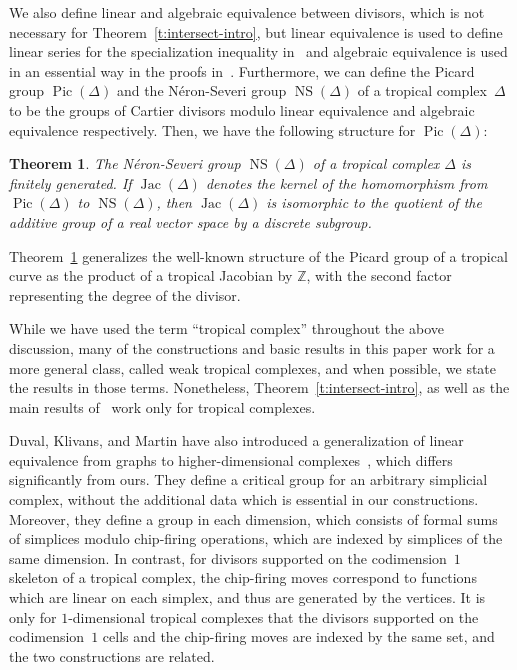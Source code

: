 \documentclass[11pt,reqno]{amsart}
\newtheorem{thm}{Theorem}[section]
\theoremstyle{definition}
\newcommand{\Jac}{\operatorname{Jac}}
\newcommand{\NS}{\operatorname{NS}}
\newcommand{\Pic}{\operatorname{Pic}}
\newcommand{\ZZ}{\mathbb Z}
\begin{document}
We also define linear and algebraic equivalence between divisors, which is not
necessary for Theorem~\ref{t:intersect-intro}, but linear equivalence is used to
define linear series for the specialization inequality
in~\cite{cartwright-specialization} and algebraic equivalence is used in an
essential way in the proofs in~\cite{cartwright-surfaces}. Furthermore, we can
define the Picard group $\Pic(\Delta)$ and the N\'eron-Severi group
$\NS(\Delta)$ of a tropical complex~$\Delta$ to be the groups of Cartier
divisors modulo linear equivalence and algebraic equivalence respectively. Then,
we have the following structure for $\Pic(\Delta)$:
\begin{thm}\label{t:picard-structure}
The N\'eron-Severi group
$\NS(\Delta)$ of a tropical complex $\Delta$ is finitely generated. If
$\Jac(\Delta)$ denotes the kernel of the homomorphism from $\Pic(\Delta)$ to
$\NS(\Delta)$, then $\Jac(\Delta)$ is isomorphic to the quotient of
the additive group of a real vector space by a discrete subgroup.
\end{thm}
\noindent Theorem~\ref{t:picard-structure} generalizes the well-known structure
of the Picard group of a tropical curve as the product of a tropical Jacobian by
$\ZZ$, with the second factor representing the degree of the divisor.

While we have used the term ``tropical complex'' throughout the above
discussion, many of the constructions and basic results in this paper work
for a more general class, called weak tropical complexes, and when
possible, we state the results in those terms. Nonetheless,
Theorem~\ref{t:intersect-intro}, as well as the main results
of~\cites{cartwright-surfaces,cartwright-specialization} work only for tropical
complexes.

Duval, Klivans, and Martin have also introduced a generalization of linear
equivalence from graphs to higher-dimensional
complexes~\cite{duval-klivans-martin}, which differs significantly from ours.
They define a critical group for an arbitrary simplicial complex, without the
additional data which is essential in our constructions. Moreover, they define a
group in each dimension, which consists of formal sums of simplices modulo
chip-firing operations, which are indexed by simplices of the same dimension. In
contrast, for divisors supported on the codimension~$1$ skeleton of a tropical
complex, the chip-firing moves correspond to functions which are linear on each
simplex, and thus are generated by the vertices. It is only for $1$-dimensional
tropical complexes that the divisors supported on the codimension~$1$ cells and
the chip-firing moves are indexed by the same set, and the two constructions are
related.
\end{document}

